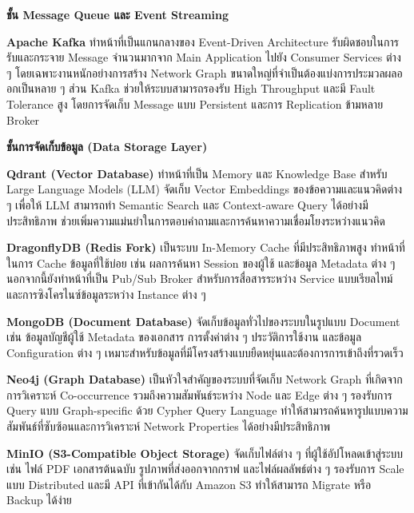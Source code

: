 \documentclass[12pt,a4paper]{article}
\begin{document}
\begin{enumerate}[leftmargin=2cm]
\begin{enumerate}
{            \vspace{0.3cm}

            \textbf{ชั้น Message Queue และ Event Streaming}

            \hspace{1cm}\textbf{Apache Kafka} ทำหน้าที่เป็นแกนกลางของ Event-Driven Architecture รับผิดชอบในการรับและกระจาย Message จำนวนมากจาก Main Application ไปยัง Consumer Services ต่าง ๆ โดยเฉพาะงานหนักอย่างการสร้าง Network Graph ขนาดใหญ่ที่จำเป็นต้องแบ่งการประมวลผลออกเป็นหลาย ๆ ส่วน Kafka ช่วยให้ระบบสามารถรองรับ High Throughput และมี Fault Tolerance สูง โดยการจัดเก็บ Message แบบ Persistent และการ Replication ข้ามหลาย Broker

            \vspace{0.3cm}

            \textbf{ชั้นการจัดเก็บข้อมูล (Data Storage Layer)}

            \hspace{1cm}\textbf{Qdrant (Vector Database)} ทำหน้าที่เป็น Memory และ Knowledge Base สำหรับ Large Language Models (LLM) จัดเก็บ Vector Embeddings ของข้อความและแนวคิดต่าง ๆ เพื่อให้ LLM สามารถทำ Semantic Search และ Context-aware Query ได้อย่างมีประสิทธิภาพ ช่วยเพิ่มความแม่นยำในการตอบคำถามและการค้นหาความเชื่อมโยงระหว่างแนวคิด

            \hspace{1cm}\textbf{DragonflyDB (Redis Fork)} เป็นระบบ In-Memory Cache ที่มีประสิทธิภาพสูง ทำหน้าที่ในการ Cache ข้อมูลที่ใช้บ่อย เช่น ผลการค้นหา Session ของผู้ใช้ และข้อมูล Metadata ต่าง ๆ นอกจากนี้ยังทำหน้าที่เป็น Pub/Sub Broker สำหรับการสื่อสารระหว่าง Service แบบเรียลไทม์ และการซิงโครไนซ์ข้อมูลระหว่าง Instance ต่าง ๆ

            \hspace{1cm}\textbf{MongoDB (Document Database)} จัดเก็บข้อมูลทั่วไปของระบบในรูปแบบ Document เช่น ข้อมูลบัญชีผู้ใช้ Metadata ของเอกสาร การตั้งค่าต่าง ๆ ประวัติการใช้งาน และข้อมูล Configuration ต่าง ๆ เหมาะสำหรับข้อมูลที่มีโครงสร้างแบบยืดหยุ่นและต้องการการเข้าถึงที่รวดเร็ว

            \hspace{1cm}\textbf{Neo4j (Graph Database)} เป็นหัวใจสำคัญของระบบที่จัดเก็บ Network Graph ที่เกิดจากการวิเคราะห์ Co-occurrence รวมถึงความสัมพันธ์ระหว่าง Node และ Edge ต่าง ๆ รองรับการ Query แบบ Graph-specific ด้วย Cypher Query Language ทำให้สามารถค้นหารูปแบบความสัมพันธ์ที่ซับซ้อนและการวิเคราะห์ Network Properties ได้อย่างมีประสิทธิภาพ

            \hspace{1cm}\textbf{MinIO (S3-Compatible Object Storage)} จัดเก็บไฟล์ต่าง ๆ ที่ผู้ใช้อัปโหลดเข้าสู่ระบบ เช่น ไฟล์ PDF เอกสารต้นฉบับ รูปภาพที่ส่งออกจากกราฟ และไฟล์ผลลัพธ์ต่าง ๆ รองรับการ Scale แบบ Distributed และมี API ที่เข้ากันได้กับ Amazon S3 ทำให้สามารถ Migrate หรือ Backup ได้ง่าย

}
\end{enumerate}
\end{enumerate}
\end{document}
